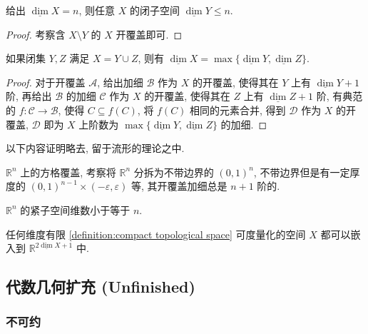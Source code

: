 \begin{lemma}
    给出 \(\underline{\dim} X = n\), 则任意 \(X\) 的闭子空间 \(\underline{\dim} Y \leq n\).

    \begin{proof}
        考察含 \(X \setminus Y\) 的 \(X\) 开覆盖即可.
    \end{proof}
\end{lemma}

\begin{lemma}
    如果闭集 \(Y,Z\) 满足 \(X = Y \cup Z\), 则有 \(\underline{\dim} X = \max \{\underline{\dim} Y, \underline{\dim} Z\}\).

    \begin{proof}
        对于开覆盖 \(\mathcal{A}\), 给出加细 \(\mathcal{B}\) 作为 \(X\) 的开覆盖, 使得其在 \(Y\) 上有 \(\underline{\dim} Y+1\) 阶,
        再给出 \(\mathcal{B}\) 的加细 \(\mathcal{C}\) 作为 \(X\) 的开覆盖, 使得其在 \(Z\) 上有 \(\underline{\dim} Z+1\) 阶, 有典范的 \(f : \mathcal{C} \to \mathcal{B}\),
        使得 \(C \subseteq f(C)\), 将 \(f(C)\) 相同的元素合并, 得到 \(\mathcal{D}\) 作为 \(X\) 的开覆盖, \(\mathcal{D}\) 即为 \(X\) 上阶数为 \(\max \{\underline{\dim} Y, \underline{\dim} Z\}\) 的加细.
    \end{proof}
\end{lemma}

以下内容证明略去, 留于流形的理论之中.

\begin{example}
    \(\mathbb{R}^n\) 上的方格覆盖, 考察将 \(\mathbb{R}^n\) 分拆为不带边界的 \({(0,1)}^n\),
    不带边界但是有一定厚度的 \({(0,1)}^{n-1} \times (-\varepsilon,\varepsilon)\) 等, 
    其开覆盖加细总是 \(n+1\) 阶的.
\end{example}

\begin{lemma}
    \(\mathbb{R}^n\) 的紧子空间维数小于等于 \(n\).
\end{lemma}

\begin{theorem}[嵌入定理]
    任何维度有限 \ref{definition:compact topological space} 可度量化的空间 \(X\) 都可以嵌入到 \(\mathbb{R}^{2 \underline{\dim} X + 1}\) 中.
\end{theorem}

\subsection{代数几何扩充 (Unfinished)}

\subsubsection{不可约}

